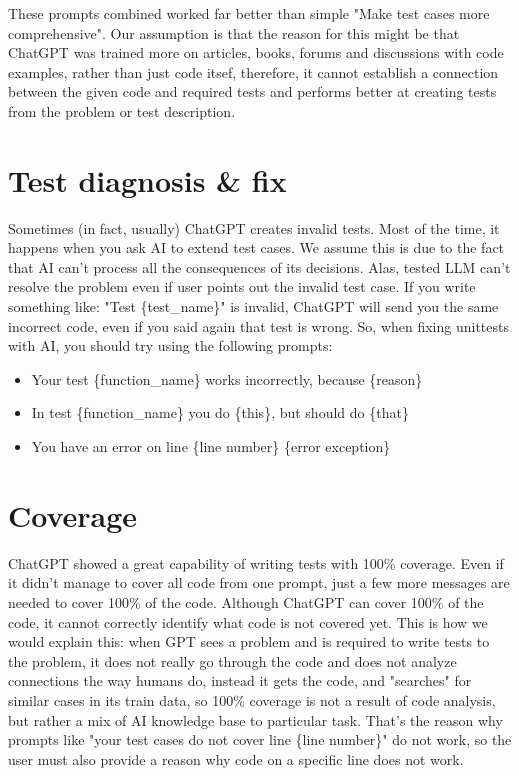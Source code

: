 \documentclass[12pt]{report}
\begin{document}
		These prompts combined worked far better than simple "Make test cases more comprehensive".
Our assumption is that the reason for this might be that ChatGPT was trained more on articles, books, forums and discussions with code examples, rather than just code itsef, therefore, it cannot establish a connection between the given code and required tests and performs better at creating tests from the problem or test description.


	\section{Test diagnosis \& fix}

		Sometimes (in fact, usually) ChatGPT creates invalid tests. Most of the time, it happens when you ask AI to
extend test cases. We assume this is due to the fact that AI can't process all the consequences of its decisions.
Alas, tested LLM can't resolve the problem even if user points out the invalid test case.
If you write something like: "Test \{test\_name\}" is invalid, ChatGPT will send you the same incorrect code, even if
you said again that test is wrong. So, when fixing unittests with AI, you should try using the following prompts:

		\begin{itemize}
			\item Your test \{function\_name\} works incorrectly, because \{reason\}
			\item In test \{function\_name\} you do \{this\}, but should do \{that\}
			\item You have an error on line \{line number\} \{error exception\}
		\end{itemize}

	\section{Coverage}

	ChatGPT showed a great capability of writing tests with 100\% coverage. Even if it didn't manage to cover all code from
one prompt, just a few more messages are needed to cover 100\% of the code. Although ChatGPT can cover 100\% of the code, it cannot
correctly identify what code is not covered yet. This is how we would explain this: when GPT sees a problem  and is required to write tests to the problem, it does not really go through the code and does not analyze connections the way humans do, instead it gets the code,
and "searches" for similar cases in its train data, so 100\% coverage is not a result of code analysis, but rather a mix of
AI knowledge base to particular task. That's the reason why prompts like "your test cases do not cover line \{line number\}" do not work, so the
user must also provide a reason why code on a specific line does not work.
\end{document}
